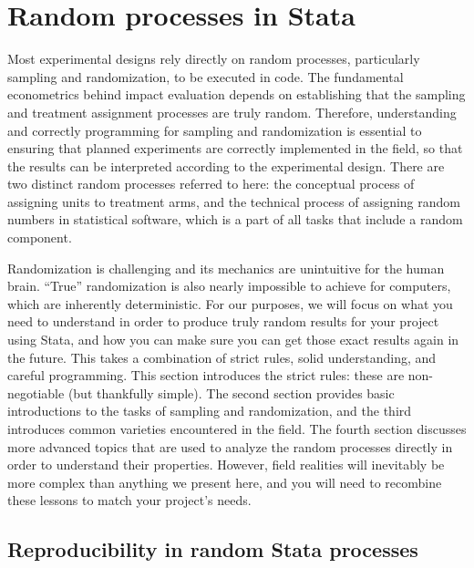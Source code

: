 
\section{Random processes in Stata}

Most experimental designs rely directly on random processes,
particularly sampling and randomization, to be executed in code.
The fundamental econometrics behind impact evaluation
depends on establishing that the sampling
and treatment assignment processes are truly random.
Therefore, understanding and correctly programming for sampling and randomization
is essential to ensuring that planned experiments
are correctly implemented in the field, so that the results
can be interpreted according to the experimental design.
There are two distinct random processes referred to here:
the conceptual process of assigning units to treatment arms,
and the technical process of assigning random numbers in statistical software,
which is a part of all tasks that include a random component.

Randomization is challenging and its mechanics are unintuitive for the human brain.
``True'' randomization is also nearly impossible to achieve for computers,
which are inherently deterministic.
For our purposes, we will focus on what you need to understand
in order to produce truly random results for your project using Stata,
and how you can make sure you can get those exact results again in the future.
This takes a combination of strict rules, solid understanding, and careful programming.
This section introduces the strict rules: these are non-negotiable (but thankfully simple).
The second section provides basic introductions to the tasks of sampling and randomization,
and the third introduces common varieties encountered in the field.
The fourth section discusses more advanced topics that are used
to analyze the random processes directly in order to understand their properties.
However, field realities will inevitably
be more complex than anything we present here,
and you will need to recombine these lessons to match your project's needs.

\subsection{Reproducibility in random Stata processes}

